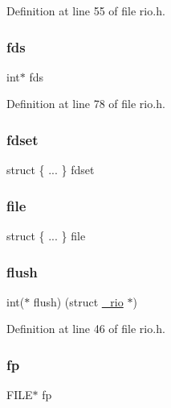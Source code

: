 Definition at line 55 of file rio.\+h.

\mbox{\label{struct__rio_ad259456372b9b7ad374dccd9d0f80eac}} 
\subsubsection{\texorpdfstring{fds}{fds}}
{\footnotesize\ttfamily int$\ast$ fds}



Definition at line 78 of file rio.\+h.

\mbox{\label{struct__rio_a5101c27f29f6ce315129e5c9a00f9cc9}} 
\subsubsection{\texorpdfstring{fdset}{fdset}}
{\footnotesize\ttfamily struct \{ ... \}   fdset}

\mbox{\label{struct__rio_abc0d7429e6b98d70aadb166991f8e5e3}} 
\subsubsection{\texorpdfstring{file}{file}}
{\footnotesize\ttfamily struct \{ ... \}   file}

\mbox{\label{struct__rio_a6400f2e1372884609119ec5fa095b6b9}} 
\subsubsection{\texorpdfstring{flush}{flush}}
{\footnotesize\ttfamily int($\ast$ flush) (struct \hyperlink{struct__rio}{\+\_\+rio} $\ast$)}



Definition at line 46 of file rio.\+h.

\mbox{\label{struct__rio_aa065f30aa9f5f9a42132c82c787ee70b}} 
\subsubsection{\texorpdfstring{fp}{fp}}
{\footnotesize\ttfamily F\+I\+LE$\ast$ fp}



